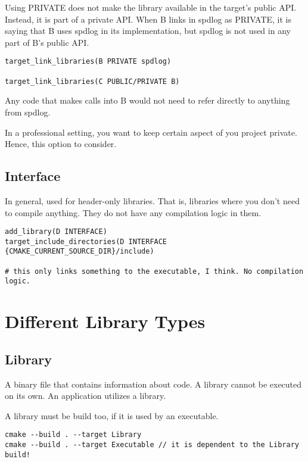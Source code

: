Using PRIVATE does not make the library available in the target's public API. Instead, it is part of a private API.
When B links in spdlog as PRIVATE, it is saying that B uses spdlog in its implementation,
but spdlog is not used in any part of B's public API. 

\begin{verbatim}
target_link_libraries(B PRIVATE spdlog)

target_link_libraries(C PUBLIC/PRIVATE B)
\end{verbatim}

Any code that makes calls into B would not need to refer directly to anything from
spdlog.


In a professional setting, you want to keep certain aspect of you project private. Hence, this option to consider.

\subsection{Interface}

In general, used for header-only libraries. That is, libraries where you don't need to compile anything. They do not have
any compilation logic in them.

\begin{verbatim}
add_library(D INTERFACE)
target_include_directories(D INTERFACE {CMAKE_CURRENT_SOURCE_DIR}/include)

# this only links something to the executable, I think. No compilation logic.
\end{verbatim}



\section{Different Library Types}

\subsection{Library}

A binary file that contains information about code.
A library cannot be executed on its own.
An application utilizes a library.

A library must be build too, if it is used by an executable.

\begin{verbatim}
cmake --build . --target Library
cmake --build . --target Executable // it is dependent to the Library build!
\end{verbatim}

